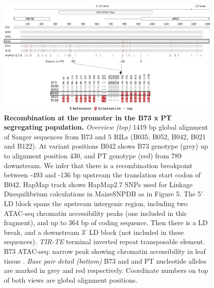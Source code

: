 \begin{figure}[t]
\begin{center}
\includegraphics[width=\linewidth]{Sup_Figures/Sup_Fig_6.png}
\caption[Recombination at the \hpc promoter in the B73 x PT segregating population.]{\textbf{Recombination at the \hpc promoter in the B73 x PT segregating population.} \textit{Overview (top)} 1419 bp global alignment of Sanger sequences from B73 and 5 RILs (B035, B052, B042, B021 and B122). At variant positions B042 shows B73 genotype (grey) up to alignment position 430, and PT genotype (red) from 789 downstream. We infer that there is  a recombination breakpoint between -493 and -136 bp upstream the translation start codon of B042.
HapMap track shows HapMap2.7 SNPs used for Linkage Disequilibrium calculations in MaizeSNPDB as in Figure 5. The 5' LD block spans the upstream intergenic region, including two ATAC-seq chromatin accessibility peaks (one included in this fragment), and up to 364 bp of \hpc coding sequence. 
Then there is a LD break, and a downstream 3' LD block (not included in these sequences). 
\textit{TIR-TE} terminal inverted repeat transposable element. 
B73 ATAC-seq: narrow peak showing chromatin accessibility in leaf tissue \cite{ricci2019-zj}.
\textit{Base pair detail (bottom)} B73 and and PT nucleotide alleles are marked in grey and red respectively.
Coordinate numbers on top of both views are global alignment positions.
}
\label{figure:Sup:hpc1_promoter}
\end{center}
\end{figure}
\clearpage


